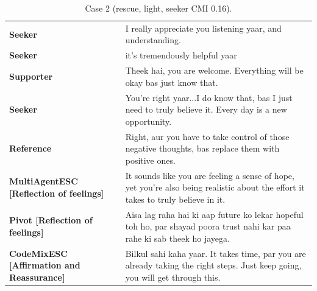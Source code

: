 \begin{table}[t]
\centering\footnotesize
\caption{Case 2 (rescue, light, seeker CMI 0.16).}
\label{tab:case2}
\begin{tabular}{@{}p{}p{}@{}}
\toprule
\textbf{Seeker} & I really appreciate you listening yaar, and understanding. \\
\textbf{Seeker} & it's tremendously helpful yaar \\
\textbf{Supporter} & Theek hai, you are welcome. Everything will be okay bas just know that. \\
\textbf{Seeker} & You're right yaar...I do know that, bas I just need to truly believe it. Every day is a new opportunity. \\
\textbf{Reference} & Right, aur you have to take control of those negative thoughts, bas replace them with positive ones. \\
\textbf{MultiAgentESC [Reflection of feelings]} & It sounds like you are feeling a sense of hope, yet you're also being realistic about the effort it takes to truly believe in it. \\
\textbf{Pivot [Reflection of feelings]} & Aisa lag raha hai ki aap future ko lekar hopeful toh ho, par shayad poora trust nahi kar paa rahe ki sab theek ho jayega. \\
\textbf{CodeMixESC [Affirmation and Reassurance]} & Bilkul sahi kaha yaar. It takes time, par you are already taking the right steps. Just keep going, you will get through this. \\
\bottomrule
\end{tabular}
\end{table}

